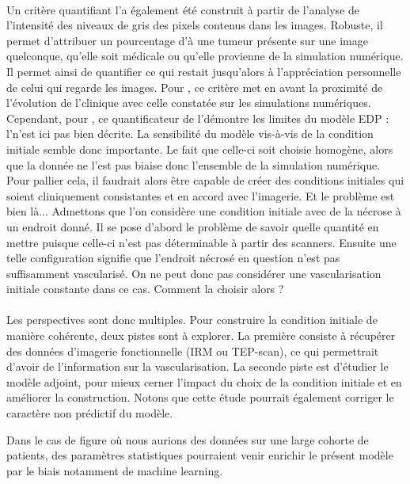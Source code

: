 \documentclass[main.tex]{subfiles}
\begin{document}
\paragraph{}
Un critère quantifiant l'\hetero a également été construit à partir de l'analyse de l'intensité des niveaux de gris des pixels contenus dans les images. Robuste, il permet d'attribuer un pourcentage d'\hetero à  une tumeur présente sur une image quelconque, qu'elle soit médicale ou qu'elle provienne  de la simulation numérique. Il permet ainsi de quantifier ce qui restait jusqu'alors à l'appréciation personnelle de celui qui regarde les images. Pour \Nber, ce critère met en avant la proximité de l'évolution de l'\hetero clinique avec celle constatée sur les simulations numériques. Cependant, pour \Chen, ce quantificateur de l'\hetero démontre les limites du modèle EDP : l'\hetero n'est ici pas bien décrite. La sensibilité du modèle vis-à-vis de la condition initiale semble donc importante. Le fait que celle-ci soit choisie  homogène, alors que la donnée ne l'est pas biaise donc l'ensemble de la simulation numérique. Pour pallier cela, il faudrait alors être capable de créer des conditions initiales qui soient cliniquement consistantes et en accord avec l'imagerie. Et le problème est bien là... Admettons que l'on considère une condition initiale avec de la nécrose à un endroit donné. Il se pose d'abord le problème de savoir quelle quantité en mettre puisque celle-ci n'est pas déterminable à partir des scanners. Ensuite une telle configuration  signifie que l'endroit nécrosé en question n'est pas suffisamment vascularisé. On ne peut donc pas considérer une vascularisation initiale constante dans ce cas. Comment la choisir alors ?


\paragraph{}
Les perspectives sont donc multiples. 
Pour construire la condition initiale de manière cohérente, deux pistes sont à explorer. La première consiste à récupérer des données d'imagerie fonctionnelle (IRM ou TEP-scan), ce qui permettrait d'avoir de l'information sur la vascularisation. La seconde piste est d'étudier le modèle adjoint, pour mieux cerner l'impact du choix de la condition initiale et en améliorer la construction.  
Notons que cette étude pourrait également corriger le caractère non prédictif du modèle. 

Dans le cas de figure où nous aurions des données sur une large cohorte de patients, des paramètres statistiques pourraient venir enrichir le présent modèle par le biais notamment de machine learning.
\end{document}
